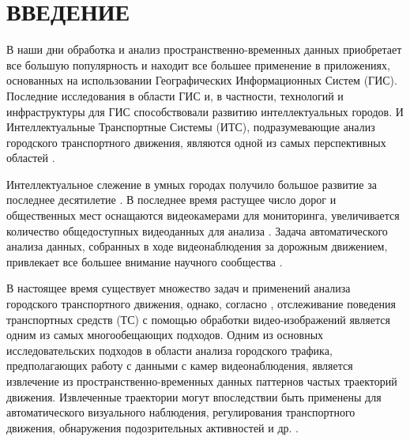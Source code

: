 \chapter{ВВЕДЕНИЕ}
\label{ch:ВВЕДЕНИЕ}

В наши дни обработка и анализ пространственно-временных данных приобретает все большую популярность и находит все большее применение в приложениях, основанных на использовании Географических Информационных Систем (ГИС). Последние исследования в области ГИС и, в частности, технологий и инфраструктуры для ГИС способствовали развитию интеллектуальных городов. И Интеллектуальные Транспортные Системы (ИТС), подразумевающие анализ городского транспортного движения, являются одной из самых перспективных областей \cite{article:2_survey_urban}.

Интеллектуальное слежение в умных городах получило большое развитие за последнее десятилетие \cite{article: 9_trb_vc_aev_sc}. В последнее время растущее число дорог и общественных мест оснащаются видеокамерами для мониторинга, увеличивается количество общедоступных видеоданных для анализа \cite{article:4_detect_eatp}. Задача автоматического анализа данных, собранных в ходе видеонаблюдения за дорожным движением, привлекает все большее внимание научного сообщества \cite{inproceedings:21_ad_dbscan_tvs}.

В настоящее время существует множество задач и применений анализа городского транспортного движения, однако, согласно \cite{article:9_trb_vc_aev_sc}, отслеживание поведения транспортных средств (ТС) с помощью обработки видео-изображений является одним из самых многообещающих подходов. Одним из основных исследовательских подходов в области анализа городского трафика, предполагающих работу с данными с камер видеонаблюдения, является извлечение из пространственно-временных данных паттернов частых траекторий движения. Извлеченные траектории могут впоследствии быть применены для автоматического визуального наблюдения, регулирования транспортного движения, обнаружения подозрительных активностей и др. \cite{article:5_survey_tbsa}\cite{article:over_tod}. 

